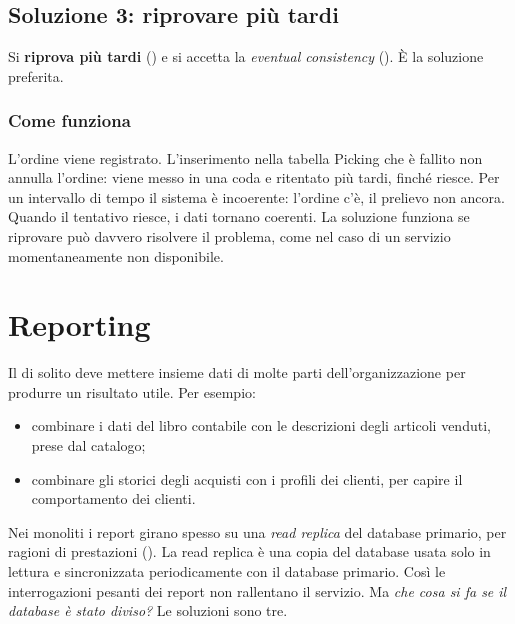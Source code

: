 \subsection{Soluzione 3: riprovare più tardi}

Si \textbf{riprova più tardi} () e si accetta la \emph{eventual consistency}
(). È la soluzione preferita.

\subsubsection{Come funziona\aggiunta}
L'ordine viene registrato. L'inserimento nella tabella Picking che è fallito non annulla l'ordine: viene messo in una
coda e ritentato più tardi, finché riesce. Per un intervallo di tempo il sistema è incoerente: l'ordine c'è, il
prelievo non ancora. Quando il tentativo riesce, i dati tornano coerenti. La soluzione funziona se riprovare può
davvero risolvere il problema, come nel caso di un servizio momentaneamente non disponibile.

\section{Reporting}
\label{sec:split-reporting}

Il  di solito deve mettere insieme dati di molte parti dell'organizzazione per produrre un risultato
utile. Per esempio:
\begin{itemize}
  \item combinare i dati del libro contabile con le descrizioni degli articoli venduti, prese dal catalogo;
  \item combinare gli storici degli acquisti con i profili dei clienti, per capire il comportamento dei clienti.
\end{itemize}

Nei monoliti i report girano spesso su una \emph{read replica} del database primario, per ragioni di prestazioni
(). La read replica è una copia del database usata solo in lettura e sincronizzata
periodicamente con il database primario. Così le interrogazioni pesanti dei report non rallentano il servizio. Ma
\emph{che cosa si fa se il database è stato diviso?} Le soluzioni sono tre.

